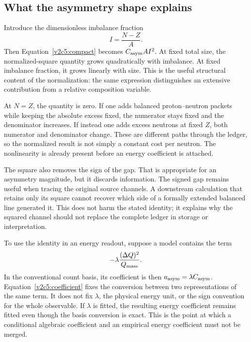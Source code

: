 \subsection{What the asymmetry shape explains}
\label{v2c5:shape}

Introduce the dimensionless imbalance fraction
\begin{equation}
 I=\frac{N-Z}{A}.
\end{equation}
Then Equation~\eqref{v2c5:compact} becomes $C_{\rm asym} A I^2$. At fixed total size, the normalized-square quantity grows quadratically with imbalance. At fixed imbalance fraction, it grows linearly with size. This is the useful structural content of the normalization: the same expression distinguishes an extensive contribution from a relative composition variable.

At $N=Z$, the quantity is zero. If one adds balanced proton--neutron packets while keeping the absolute excess fixed, the numerator stays fixed and the denominator increases. If instead one adds excess neutrons at fixed $Z$, both numerator and denominator change. These are different paths through the ledger, so the normalized result is not simply a constant cost per neutron. The nonlinearity is already present before an energy coefficient is attached.

The square also removes the sign of the gap. That is appropriate for an asymmetry magnitude, but it discards information. The signed gap remains useful when tracing the original source channels. A downstream calculation that retains only its square cannot recover which side of a formally extended balanced line generated it. This does not harm the stated identity; it explains why the squared channel should not replace the complete ledger in storage or interpretation.

To use the identity in an energy readout, suppose a model contains the term
\begin{equation}
 -\lambda\frac{(\Delta Q)^2}{Q_{\rm mass}}.
 \label{v2c5:energyasym}
\end{equation}
In the conventional count basis, its coefficient is then $a_{\rm asym}=\lambda C_{\rm asym}$. Equation~\eqref{v2c5:coefficient} fixes the conversion between two representations of the same term. It does not fix $\lambda$, the physical energy unit, or the sign convention for the whole observable. If $\lambda$ is fitted, the resulting energy coefficient remains fitted even though the basis conversion is exact. This is the point at which a conditional algebraic coefficient and an empirical energy coefficient must not be merged.

